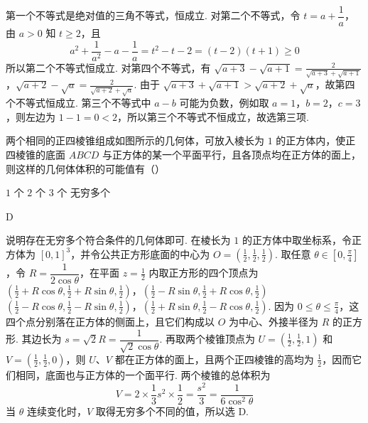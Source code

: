 \begin{solution}
第一个不等式是绝对值的三角不等式，恒成立. 对第二个不等式，令 \(t=a+\dfrac1a\)，由 \(a>0\) 知 \(t\geqslant2\)，且
\[
a^2+\frac1{a^2}-a-\frac1a=t^2-t-2=(t-2)(t+1)\geqslant0
\]
所以第二个不等式恒成立. 对第四个不等式，有
\(\sqrt{a+3}-\sqrt{a+1}=\frac{2}{\sqrt{a+3}+\sqrt{a+1}}\)，\(\sqrt{a+2}-\sqrt a=\frac{2}{\sqrt{a+2}+\sqrt a}\).
由于 \(\sqrt{a+3}+\sqrt{a+1}>\sqrt{a+2}+\sqrt a\)，故第四个不等式恒成立. 第三个不等式中 \(a-b\) 可能为负数，例如取 \(a=1\)，\(b=2\)，\(c=3\)，则左边为 \(1-1=0<2\)，所以第三个不等式不恒成立，故选第三项.
\end{solution}

\begin{problem}
两个相同的正四棱锥组成如图所示的几何体，可放入棱长为 \(1\) 的正方体内，使正四棱锥的底面 \(ABCD\) 与正方体的某一个平面平行，且各顶点均在正方体的面上，则这样的几何体体积的可能值有（\quad）


\choices
    {\(1\) 个}
    {\(2\) 个}
    {\(3\) 个}
    {无穷多个}
\end{problem}

\begin{answer}
D
\end{answer}

\begin{solution}
说明存在无穷多个符合条件的几何体即可. 在棱长为 \(1\) 的正方体中取坐标系，令正方体为 \([0,1]^3\)，并令公共正方形底面的中心为 \(O=(\frac12,\frac12,\frac12)\). 取任意 \(\theta\in[0,\frac\pi4]\)，令 \(R=\dfrac{1}{2\cos\theta}\)，在平面 \(z=\frac12\) 内取正方形的四个顶点为
\(\left(\frac12+R\cos\theta,\frac12+R\sin\theta,\frac12\right)\)，\(\left(\frac12-R\sin\theta,\frac12+R\cos\theta,\frac12\right)\)
\(\left(\frac12-R\cos\theta,\frac12-R\sin\theta,\frac12\right)\)，\(\left(\frac12+R\sin\theta,\frac12-R\cos\theta,\frac12\right)\).
因为 \(0\leqslant\theta\leqslant\frac\pi4\)，这四个点分别落在正方体的侧面上，且它们构成以 \(O\) 为中心、外接半径为 \(R\) 的正方形. 其边长为 \(s=\sqrt2R=\dfrac{1}{\sqrt2\cos\theta}\). 再取两个棱锥顶点为 \(U=(\frac12,\frac12,1)\) 和 \(V=(\frac12,\frac12,0)\)，则 \(U\)、\(V\) 都在正方体的面上，且两个正四棱锥的高均为 \(\frac12\)，因而它们相同，底面也与正方体的一个面平行. 两个棱锥的总体积为
\[
V=2\times\frac13s^2\times\frac12=\frac{s^2}{3}=\frac{1}{6\cos^2\theta}
\]
当 \(\theta\) 连续变化时，\(V\) 取得无穷多个不同的值，所以选 D.
\end{solution}

